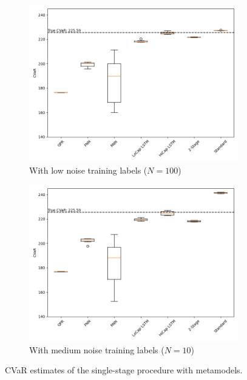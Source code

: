 \documentclass{article}
\begin{document}
\begin{figure}[ht!]
    \centering
    \begin{subfigure}{0.48\textwidth}
        \includegraphics[width=\textwidth]{./figures/singleStage/CVaRlowNoise.png}
        \caption{With low noise training labels ($N=100$)}
    \end{subfigure}\hfill
    \begin{subfigure}{0.48\textwidth}
        \includegraphics[width=\textwidth]{./figures/singleStage/CVaRmediumNoise.png}
        \caption{With medium noise training labels ($N=10$)}
    \end{subfigure}
    \caption{CVaR estimates of the single-stage procedure with metamodels.}
    \label{fig:CVaRsingleStage}
\end{figure}
\end{document}
